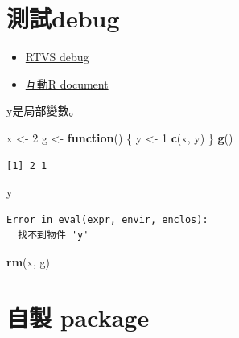 \documentclass[]{book}
\newenvironment{Shaded}{\begin{snugshade}}{\end{snugshade}}
\newcommand{\ControlFlowTok}[1]{\textcolor[rgb]{0.13,0.29,0.53}{\textbf{#1}}}
\newcommand{\DecValTok}[1]{\textcolor[rgb]{0.00,0.00,0.81}{#1}}
\newcommand{\KeywordTok}[1]{\textcolor[rgb]{0.13,0.29,0.53}{\textbf{#1}}}
\newcommand{\NormalTok}[1]{#1}
\newcommand{\StringTok}[1]{\textcolor[rgb]{0.31,0.60,0.02}{#1}}
\providecommand{\tightlist}{%
  \setlength{\itemsep}{0pt}\setlength{\parskip}{0pt}}
\theoremstyle{definition}
\theoremstyle{definition}
\theoremstyle{definition}
\theoremstyle{remark}
\begin{document}
\hypertarget{debug}{%
\section{測試debug}\label{debug}}

\begin{itemize}
\tightlist
\item
  \href{https://docs.microsoft.com/zh-tw/visualstudio/rtvs/debugging-r-in-visual-studio?view=vs-2017}{RTVS
  debug}\\
\item
  \href{https://www.rdocumentation.org/packages/base/versions/3.5.1/topics/attributes}{互動R
  document}
\end{itemize}

y是局部變數。

\begin{Shaded}
\begin{Highlighting}[]
\NormalTok{x <-}\StringTok{ }\DecValTok{2}
\NormalTok{g <-}\StringTok{ }\ControlFlowTok{function}\NormalTok{() \{}
\NormalTok{    y <-}\StringTok{ }\DecValTok{1}
    \KeywordTok{c}\NormalTok{(x, y)}
\NormalTok{\}}
\KeywordTok{g}\NormalTok{()}
\end{Highlighting}
\end{Shaded}

\begin{verbatim}
[1] 2 1
\end{verbatim}

\begin{Shaded}
\begin{Highlighting}[]
\NormalTok{y}
\end{Highlighting}
\end{Shaded}

\begin{verbatim}
Error in eval(expr, envir, enclos):
  找不到物件 'y'
\end{verbatim}

\begin{Shaded}
\begin{Highlighting}[]
\KeywordTok{rm}\NormalTok{(x, g)}
\end{Highlighting}
\end{Shaded}

\hypertarget{-package}{%
\section{自製 package}\label{-package}}
\end{document}
